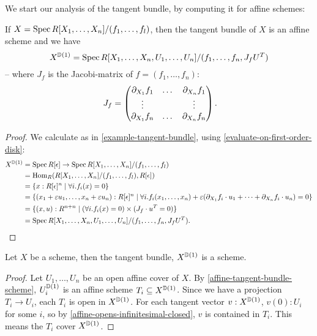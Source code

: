 We start our analysis of the tangent bundle,
by computing it for affine schemes:

\begin{lemma}%
  \label{affine-tangent-bundle-scheme}
  If $X=\operatorname{Spec} R[X_1,\dots,X_n]/(f_1,\dots,f_l)$,
  then the tangent bundle of $X$ is an affine scheme and we have
  \[
    X^{\mathbb{D}(1)}=\operatorname{Spec} R[X_1,\dots,X_n,U_1,\dots,U_n]/(f_1,\dots,f_n,J_f U^T)
  \]
  -- where $J_f$ is the Jacobi-matrix of $f=(f_1,\dots,f_n)$:
  \[
    J_f=
    \left(
      \begin{matrix}
        \partial_{X_1}f_1 & \dots & \partial_{X_n}f_1 \\
        \vdots &  & \vdots \\
        \partial_{X_1}f_n & \dots & \partial_{X_n}f_n 
      \end{matrix}
    \right)
    \rlap{.}
  \]
\end{lemma}

\begin{proof}
  We calculate as in \cref{example-tangent-bundle}, using \cref{evaluate-on-first-order-disk}:
  \begin{align*}
    X^{\D(1)}&= \Spec R[\epsilon] \to \Spec R[X_1,\dots,X_n]/(f_1,\dots,f_l)\\
             &= \Hom_R(R[X_1,\dots,X_n]/(f_1,\dots,f_l),R[\epsilon]) \\
             &= \{ x:R[\epsilon]^n \mid \forall i. f_i(x)=0 \} \\
             &= \{ (x_1+\varepsilon u_1, \dots , x_n+\varepsilon u_n):R[\epsilon]^n \mid \forall i. f_i(x_1,\dots,x_n)+\varepsilon(\partial_{X_1}f_i\cdot u_1+\dots+\partial_{X_n}f_i\cdot u_n) =0 \} \\
             &= \{ (x,u):R^{n+n}\mid (\forall i . f_i(x)=0) \times (J_f\cdot u^T=0) \} \\
             &= \Spec R[X_1,\dots,X_n,U_1,\dots,U_n]/(f_1,\dots,f_n,J_f U^T)
               \rlap{.}
  \end{align*}
\end{proof}

\begin{theorem}%
  Let $X$ be a scheme,
  then the tangent bundle, $X^{\mathbb{D}(1)}$
  is a scheme.
\end{theorem}

\begin{proof}
  Let $U_1,\dots,U_n$ be an open affine cover of $X$.
  By \cref{affine-tangent-bundle-scheme}, $U_i^{\mathbb{D}(1)}$ is an affine scheme $T_i\subseteq X^{\mathbb{D}(1)}$.
  Since we have a projection $T_i\to U_i$, each $T_i$ is open in $X^{\mathbb{D}(1)}$.
  For each tangent vector $v:X^{\mathbb{D}(1)}$,
  $v(0):U_i$ for some $i$,
  so by \cref{affine-opens-infinitesimal-closed},
  $v$ is contained in $T_i$.
  This means the $T_i$ cover $X^{\mathbb{D}(1)}$.
\end{proof}

